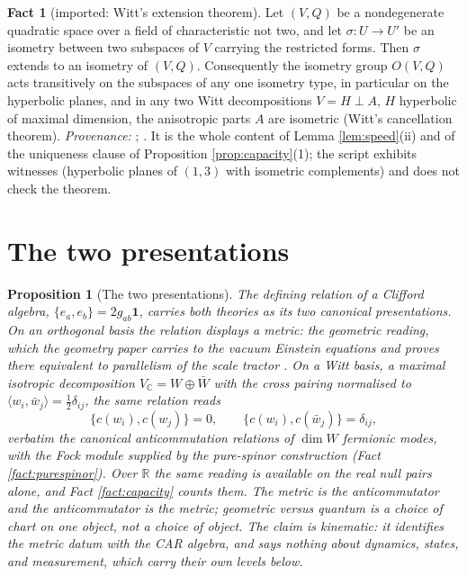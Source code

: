 \documentclass[11pt]{article}
\newtheorem{proposition}[theorem]{Proposition}
\theoremstyle{definition}
\newtheorem{fact}[theorem]{Fact}
\newcommand{\R}{\mathbb{R}}
\newcommand{\C}{\mathbb{C}}
\newcommand{\ip}[2]{\langle #1, #2\rangle}
\begin{document}
\begin{fact}[imported: Witt's extension theorem]\label{fact:witt}
Let $(V, Q)$ be a nondegenerate quadratic space over a field of characteristic not two, and let $\sigma : U \to U'$ be an isometry between two subspaces of $V$ carrying the restricted forms. Then $\sigma$ extends to an isometry of $(V, Q)$. Consequently the isometry group $O(V, Q)$ acts transitively on the subspaces of any one isometry type, in particular on the hyperbolic planes, and in any two Witt decompositions $V = H \perp A$, $H$ hyperbolic of maximal dimension, the anisotropic parts $A$ are isometric (Witt's cancellation theorem). \emph{Provenance:} \cite{Witt1937}; \cite[Ch.~I, \S4]{Lam2005}. It is the whole content of Lemma \ref{lem:speed}(ii) and of the uniqueness clause of Proposition \ref{prop:capacity}(1); the script exhibits witnesses (hyperbolic planes of $(1,3)$ with isometric complements) and does not check the theorem.
\end{fact}

\section{The two presentations}\label{sec:two}

\begin{proposition}[The two presentations]\label{prop:twopresentations}
The defining relation of a Clifford algebra, $\{e_{a}, e_{b}\} = 2g_{ab}\mathbf{1}$, carries both theories as its two canonical presentations. On an orthogonal basis the relation displays a metric: the geometric reading, which the geometry paper carries to the vacuum Einstein equations and proves there equivalent to parallelism of the scale tractor \cite[Thm.~4.5]{ButlerT6}. On a Witt basis, a maximal isotropic decomposition $V_{\C} = W \oplus \bar{W}$ with the cross pairing normalised to $\ip{w_{i}}{\bar{w}_{j}} = \tfrac12\delta_{ij}$, the same relation reads
\[
\{c(w_{i}), c(w_{j})\} = 0, \qquad \{c(w_{i}), c(\bar{w}_{j})\} = \delta_{ij},
\]
verbatim the canonical anticommutation relations of $\dim W$ fermionic modes, with the Fock module supplied by the pure-spinor construction (Fact \ref{fact:purespinor}). Over $\R$ the same reading is available on the real null pairs alone, and Fact \ref{fact:capacity} counts them. The metric is the anticommutator and the anticommutator is the metric; geometric versus quantum is a choice of chart on one object, not a choice of object. The claim is kinematic: it identifies the metric datum with the CAR algebra, and says nothing about dynamics, states, and measurement, which carry their own levels below.
\end{proposition}
\end{document}
